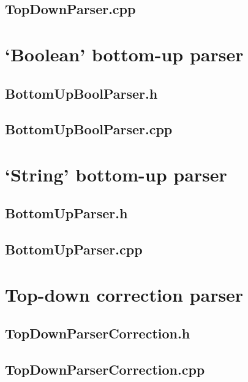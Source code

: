 \subsection*{TopDownParser.cpp}


\section*{`Boolean' bottom-up parser}

\subsection*{BottomUpBoolParser.h}


\subsection*{BottomUpBoolParser.cpp}


\section*{`String' bottom-up parser}

\subsection*{BottomUpParser.h}


\subsection*{BottomUpParser.cpp}


\section*{Top-down correction parser}

\subsection*{TopDownParserCorrection.h}


\subsection*{TopDownParserCorrection.cpp}


